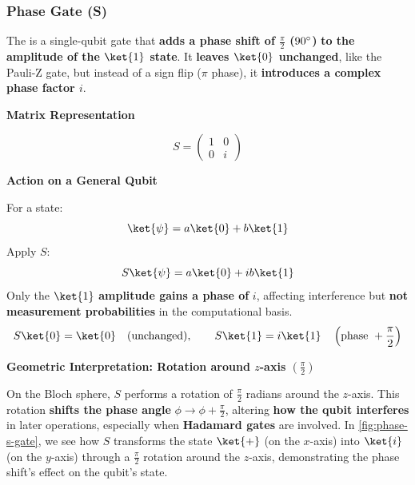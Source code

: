 \subsubsection{Phase Gate (S)}\label{subsubsection: Phase Gate S}

The  is a single-qubit gate that \textbf{adds a phase shift of $\frac{\pi}{2}$ ($90^\circ$)} \textbf{to the amplitude of the $\ket{1}$ state}. It \textbf{leaves $\ket{0}$ unchanged}, like the Pauli-Z gate, but instead of a sign flip ($\pi$ phase), it \textbf{introduces a complex phase factor $i$}.

\highspace
\begin{flushleft}
    \textcolor{Green3}{ \textbf{Matrix Representation}}
\end{flushleft}
\begin{equation}
    S = \begin{pmatrix}
        1 & 0 \\ 0 & i
    \end{pmatrix}
\end{equation}

\highspace
\begin{flushleft}
    \textcolor{Green3}{ \textbf{Action on a General Qubit}}
\end{flushleft}
For a state:
\begin{equation*}
    \ket{\psi} = a\ket{0} + b\ket{1}
\end{equation*}
Apply $S$:
\begin{equation*}
    S\ket{\psi} = a\ket{0} + ib\ket{1}
\end{equation*}
Only the $\ket{1}$ \textbf{amplitude gains a phase of} $i$, affecting interference but \textbf{not measurement probabilities} in the computational basis.
\begin{equation*}
    S\ket{0} = \ket{0} \hspace{1em} \text{(unchanged)}, \hspace{2em} S\ket{1} = i\ket{1} \hspace{1em} \left(\text{phase } + \frac{\pi}{2}\right)
\end{equation*}

\highspace
\begin{flushleft}
    \textcolor{Green3}{ \textbf{Geometric Interpretation: Rotation around $z$-axis $\left(\frac{\pi}{2}\right)$}}
\end{flushleft}
On the Bloch sphere, $S$ performs a rotation of $\frac{\pi}{2}$ radians around the $z$-axis. This rotation \textbf{shifts the phase angle} $\phi \rightarrow \phi + \frac{\pi}{2}$, altering \textbf{how the qubit interferes} in later operations, especially when \textbf{Hadamard gates} are involved. In \autoref{fig:phase-s-gate}, we see how $S$ transforms the state $\ket{+}$ (on the $x$-axis) into $\ket{i}$ (on the $y$-axis) through a $\frac{\pi}{2}$ rotation around the $z$-axis, demonstrating the phase shift's effect on the qubit's state.

